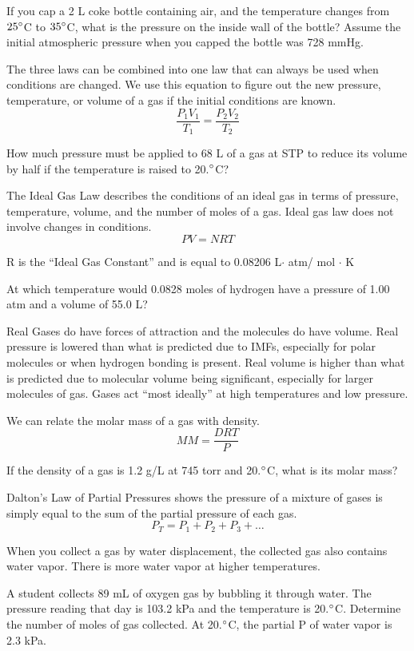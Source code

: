 \documentclass[../hchem.tex]{subfiles}
\begin{document}
\ex If you cap a 2 L coke bottle containing air, and the temperature changes from $25\degree$C to $35\degree$C, what is the pressure on the inside wall of the bottle?
Assume the initial atmospheric pressure when you capped the bottle was 728 mmHg. 

The three laws can be combined into one law that can always be used when conditions are changed. We use this equation to figure out the new 
pressure, temperature, or volume of a gas if the initial conditions are known.
\[\frac{P_1V_1}{T_1}=\frac{P_2V_2}{T_2}\]

\ex How much pressure must be applied to 68 L of a gas at STP to reduce its volume by half if the temperature is raised to 20.$\degree$C?

The Ideal Gas Law describes the conditions of an ideal gas in terms of pressure, temperature, volume, and the number of moles of a gas.
Ideal gas law does not involve changes in conditions.
\[PV=NRT\]

R is the ``Ideal Gas Constant'' and is equal to 0.08206 L$\cdot$ atm/ mol $\cdot$ K 

\ex At which temperature would 0.0828 moles of hydrogen have a pressure of 1.00 atm and a volume of 55.0 L? 

Real Gases do have forces of attraction and the molecules do have volume. Real pressure is lowered than what is predicted due to IMFs, especially 
for polar molecules or when hydrogen bonding is present. Real volume is higher than what is predicted due to molecular volume being significant, especially for larger molecules of gas.
Gases act ``most ideally'' at high temperatures and low pressure.

We can relate the molar mass of a gas with density.
\[MM=\frac{DRT}{P}\]

\ex If the density of a gas is 1.2 g/L at 745 torr and 20.$\degree$C, what is its molar mass? 

Dalton's Law of Partial Pressures shows the pressure of a mixture of gases is simply equal to the sum of the partial pressure of each gas.
\[P_T = P_1 + P_2 + P_3 + \dots\]

When you collect a gas by water displacement, the collected gas also contains water vapor. There is more water vapor at higher temperatures.

\ex A student collects 89 mL of oxygen gas by bubbling it through water. The pressure reading that day is 103.2 kPa and the temperature is 20.$\degree$C. Determine the number of moles 
of gas collected. At 20.$\degree$C, the partial P of water vapor is 2.3 kPa.
\end{document}

